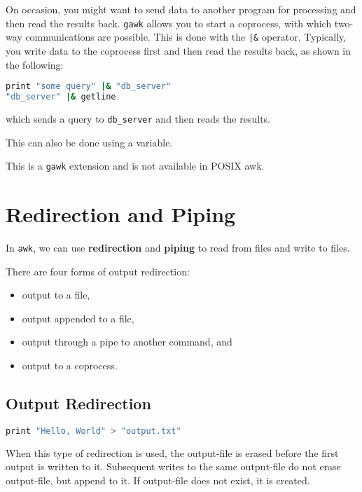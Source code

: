 On occasion, you might want to send data to another program for processing and then read the results back.
\lstinline|gawk| allows you to start a coprocess, with which two-way communications are possible.
This is done with the \lstinline:|&: operator.
Typically, you write data to the coprocess first and then read the results back, as shown in the following:

\begin{lstlisting}[language=bash]
print "some query" |& "db_server"
"db_server" |& getline
\end{lstlisting}
which sends a query to \lstinline|db_server| and then reads the results.

This can also be done using a variable.

\begin{remark}
This is a \lstinline|gawk| extension and is not available in POSIX awk.
\end{remark}

\section{Redirection and Piping}

In \lstinline|awk|, we can use \textbf{redirection} and \textbf{piping} to read from files and write to files.

There are four forms of output redirection: 
\begin{itemize}
  \item output to a file,
  \item output appended to a file,
  \item output through a pipe to another command, and
  \item output to a coprocess.

\end{itemize}

\subsection{Output Redirection}

\begin{lstlisting}[language=bash]
print "Hello, World" > "output.txt"
\end{lstlisting}
When this type of redirection is used, the output-file is erased before the first output is written to it.
Subsequent writes to the same output-file do not erase output-file, but append to it.
If output-file does not exist, it is created. 


